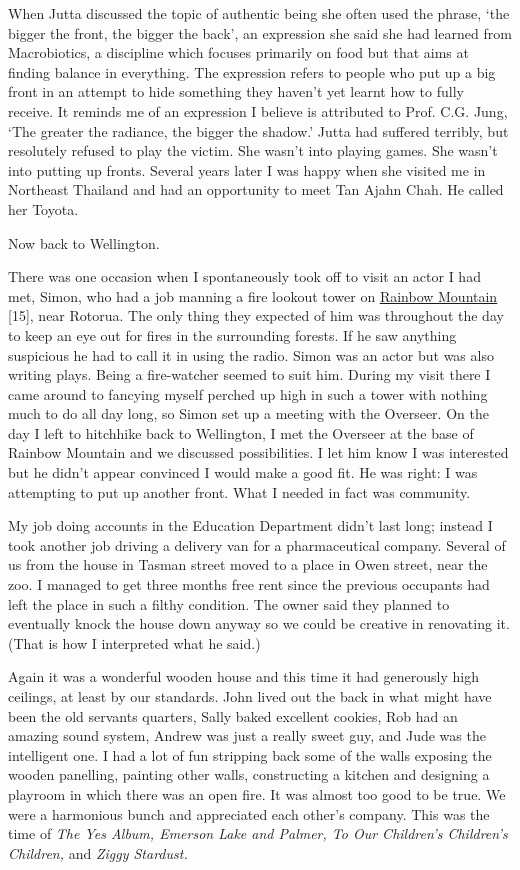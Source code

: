 When Jutta discussed the topic of authentic being she often used the
phrase, `the bigger the front, the bigger the back', an expression she
said she had learned from Macrobiotics, a discipline which focuses
primarily on food but that aims at finding balance in everything. The
expression refers to people who put up a big front in an attempt to hide
something they haven't yet learnt how to fully receive. It reminds me of
an expression I believe is attributed to Prof. C.G. Jung, `The greater
the radiance, the bigger the shadow.' Jutta had suffered terribly, but
resolutely refused to play the victim. She wasn't into playing games.
She wasn't into putting up fronts. Several years later I was happy when
she visited me in Northeast Thailand and had an opportunity to meet Tan
Ajahn Chah. He called her Toyota.

Now back to Wellington.

There was one occasion when I spontaneously took off to visit an actor I
had met, Simon, who had a job manning a fire lookout tower on
\href{https://www.newzealand.com/int/feature/rainbow-mountain/}{\underline{Rainbow
Mountain}} {[}15{]}, near Rotorua. The only thing they expected of him
was throughout the day to keep an eye out for fires in the surrounding
forests. If he saw anything suspicious he had to call it in using the
radio. Simon was an actor but was also writing plays. Being a
fire-watcher seemed to suit him. During my visit there I came around to
fancying myself perched up high in such a tower with nothing much to do
all day long, so Simon set up a meeting with the Overseer. On the day I
left to hitchhike back to Wellington, I met the Overseer at the base of
Rainbow Mountain and we discussed possibilities. I let him know I was
interested but he didn't appear convinced I would make a good fit. He
was right: I was attempting to put up another front. What I needed in
fact was community.

My job doing accounts in the Education Department didn't last long;
instead I took another job driving a delivery van for a pharmaceutical
company. Several of us from the house in Tasman street moved to a place
in Owen street, near the zoo. I managed to get three months free rent
since the previous occupants had left the place in such a filthy
condition. The owner said they planned to eventually knock the house
down anyway so we could be creative in renovating it. (That is how I
interpreted what he said.)

Again it was a wonderful wooden house and this time it had generously
high ceilings, at least by our standards. John lived out the back in
what might have been the old servants quarters, Sally baked excellent
cookies, Rob had an amazing sound system, Andrew was just a really sweet
guy, and Jude was the intelligent one. I had a lot of fun stripping back
some of the walls exposing the wooden panelling, painting other walls,
constructing a kitchen and designing a playroom in which there was an
open fire. It was almost too good to be true. We were a harmonious bunch
and appreciated each other's company. This was the time of \emph{The Yes
Album, Emerson Lake and Palmer, To Our Children's Children's Children,}
and \emph{Ziggy Stardust.}


